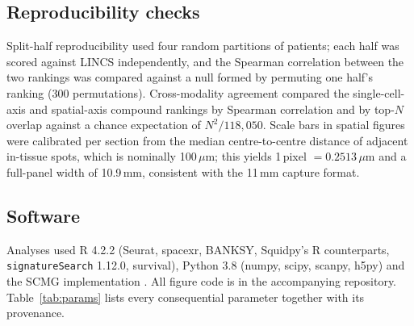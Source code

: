 \subsection{Reproducibility checks}

Split-half reproducibility used four random partitions of patients; each half was scored
against LINCS independently, and the Spearman correlation between the two rankings was
compared against a null formed by permuting one half's ranking (300 permutations).
Cross-modality agreement compared the single-cell-axis and spatial-axis compound rankings
by Spearman correlation and by top-$N$ overlap against a chance expectation of $N^2/118{,}050$.
Scale bars in spatial figures were calibrated per section from the median centre-to-centre
distance of adjacent in-tissue spots, which is nominally 100\,$\mu$m; this yields
1\,pixel $=0.2513\,\mu$m and a full-panel width of 10.9\,mm, consistent with the 11\,mm
capture format.

\subsection{Software}

Analyses used R 4.2.2 (Seurat, spacexr, BANKSY, Squidpy's R counterparts,
\texttt{signatureSearch} 1.12.0, survival), Python 3.8 (numpy, scipy, scanpy, h5py) and the
SCMG implementation \citep{pan2026scmg,xingjiepan_scmg}.
All figure code is in the accompanying repository. Table~\ref{tab:params} lists every
consequential parameter together with its provenance.


